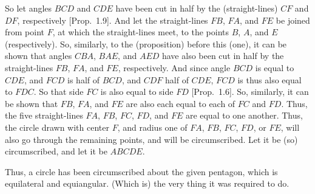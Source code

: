 \begin{Parallel}{}{}
{So let angles $BCD$ and $CDE$ have  been cut
in half by  the (straight-lines) $CF$ and $DF$, respectively [Prop.~1.9]. And let the straight-lines
$FB$, $FA$, and $FE$ be joined from point $F$, at which the
straight-lines meet, to the points $B$, $A$, and $E$ (respectively).
So, similarly, to the (proposition) before this (one), it can be shown that
angles $CBA$, $BAE$, and $AED$ have also  been cut in half by
the straight-lines $FB$, $FA$, and $FE$, respectively. And since
angle $BCD$ is equal to $CDE$, and $FCD$ is half of $BCD$, and $CDF$ half
of $CDE$, $FCD$ is thus also equal to $FDC$. So that side $FC$ is also equal to
side $FD$ [Prop.~1.6]. So, similarly, it can be
shown that $FB$, $FA$, and $FE$ are also each equal to each of $FC$ and $FD$. 
Thus, the five straight-lines $FA$, $FB$, $FC$, $FD$, and $FE$ are equal to
one another. Thus, the circle drawn with center $F$, and radius one of
$FA$, $FB$, $FC$, $FD$, or $FE$, will also go through the remaining points, and
will be circumscribed. Let it be (so) circumscribed, and let
it be $ABCDE$.

Thus, a circle has been circumscribed about the given pentagon, which
is equilateral and equiangular. (Which is) the very thing it was required to
do.}
\end{Parallel}

